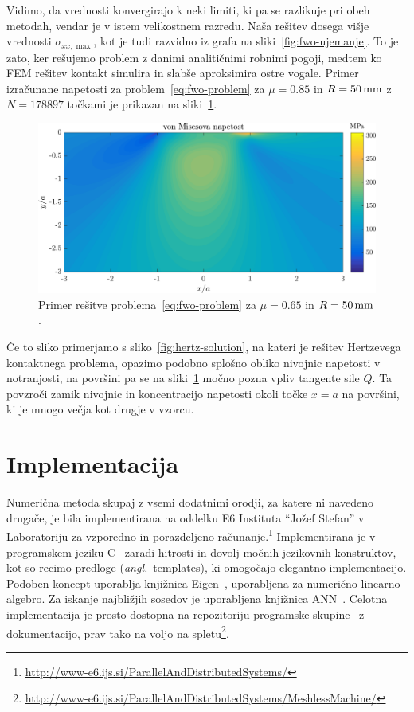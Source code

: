 \documentclass[12pt,a4paper,twoside]{article}
\theoremstyle{definition} %
\theoremstyle{plain} %
\numberwithin{equation}{section}
\newcommand{\ts}{\sigma}
\newcommand{\ang}[1]{(\hspace{-1.5px}\textit{angl.}\ #1)}
\let\oldsection\section
\def\section{\cleardoublepage\oldsection}
\newcommand{\CC}{C\nolinebreak\hspace{-.05em}\raisebox{.4ex}{\tiny\bf +}\nolinebreak\hspace{-.10em}\raisebox{.4ex}{\tiny\bf +}}
\begin{document}
Vidimo, da vrednosti konvergirajo k neki limiti, ki pa se razlikuje pri obeh metodah, vendar je v
istem velikostnem razredu. Naša rešitev dosega višje vrednosti $\ts_{xx, \max}$, kot je tudi
razvidno iz grafa na sliki~\ref{fig:fwo-ujemanje}. To je zato, ker rešujemo problem z danimi
analitičnimi robnimi pogoji, medtem ko FEM rešitev kontakt simulira in slabše aproksimira ostre
vogale. Primer izračunane napetosti za problem~\eqref{eq:fwo-problem} za $\mu=0.85$ in $R =
\unit[50]{mm}$ z $N = 178897$ točkami je prikazan na sliki~\ref{fig:fwo-solution}.

\begin{figure}[h]
  \centering
  \includegraphics[width=\textwidth]{images/fwo_solution.png}
  \caption{Primer rešitve problema~\eqref{eq:fwo-problem} za $\mu=0.65$ in $R =
  \unit[50]{mm}$.}
  \label{fig:fwo-solution}
\end{figure}

Če to sliko primerjamo s sliko~\ref{fig:hertz-solution}, na kateri je rešitev Hertzevega kontaktnega
problema, opazimo podobno splošno obliko nivojnic napetosti v notranjosti, na površini pa se na
sliki~\ref{fig:fwo-solution} močno pozna vpliv tangente sile $Q$. Ta povzroči zamik nivojnic in
koncentracijo napetosti okoli točke $x = a$ na površini, ki je mnogo večja kot drugje v vzorcu.

\section{Implementacija}
\label{sec:implementacija}
Numerična metoda skupaj z vsemi dodatnimi orodji, za katere ni navedeno drugače, je bila
implementirana na oddelku E6 Instituta ``Jožef Stefan'' v Laboratoriju za vzporedno in porazdeljeno
računanje.\footnote{\url{http://www-e6.ijs.si/ParallelAndDistributedSystems/}} Implementirana je
v programskem jeziku \CC~\cite{stroustrup1995c++} zaradi hitrosti in dovolj močnih jezikovnih
konstruktov, kot so recimo predloge \ang{templates}, ki omogočajo elegantno implementacijo. Podoben
koncept uporablja knjižnica Eigen~\cite{eigenweb}, uporabljena za numerično linearno algebro. Za
iskanje najbližjih sosedov je uporabljena knjižnica ANN~\cite{mount1998ann}. Celotna
implementacija je prosto dostopna na repozitoriju programske skupine~\cite{utils_web} z
dokumentacijo, prav tako na voljo na
spletu\footnote{\url{http://www-e6.ijs.si/ParallelAndDistributedSystems/MeshlessMachine/}}.
\end{document}
